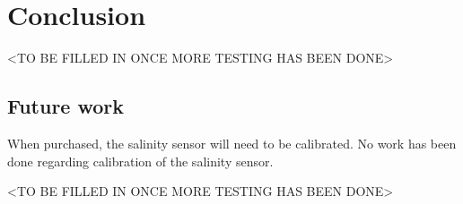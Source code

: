 
\section{Conclusion}\label{sec:conclusion}
<TO BE FILLED IN ONCE MORE TESTING HAS BEEN DONE>

\subsection{Future work}
When purchased, the salinity sensor will need to be calibrated. No work has been done regarding calibration of the salinity sensor.

<TO BE FILLED IN ONCE MORE TESTING HAS BEEN DONE>